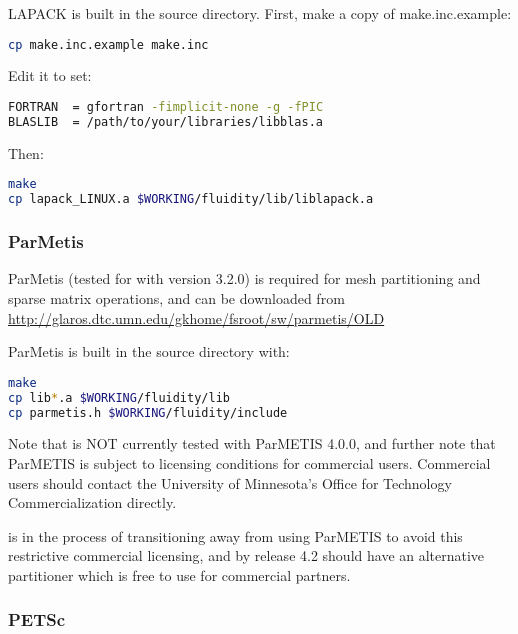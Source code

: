 LAPACK is built in the source directory. First, make a copy of
make.inc.example:

\begin{lstlisting}[language=bash]
cp make.inc.example make.inc
\end{lstlisting}

Edit it to set:

\begin{lstlisting}[language=bash]
FORTRAN  = gfortran -fimplicit-none -g -fPIC
BLASLIB  = /path/to/your/libraries/libblas.a
\end{lstlisting}

Then:

\begin{lstlisting}[language=bash]
make
cp lapack_LINUX.a $WORKING/fluidity/lib/liblapack.a
\end{lstlisting}

\subsubsection{ParMetis}
\label{sec:required_libraries_numerical_parmetis}

ParMetis (tested for \fluidity with version 3.2.0) is required for mesh
partitioning and sparse matrix operations, and can be downloaded from
\url{http://glaros.dtc.umn.edu/gkhome/fsroot/sw/parmetis/OLD}

ParMetis is built in the source directory with:

\begin{lstlisting}[language=bash]
make
cp lib*.a $WORKING/fluidity/lib
cp parmetis.h $WORKING/fluidity/include
\end{lstlisting}

Note that \fluidity is NOT currently tested with ParMETIS 4.0.0, and further
note that ParMETIS is subject to licensing conditions for commercial users.
Commercial users should contact the University of Minnesota's Office for
Technology Commercialization directly. 

\fluidity is in the process of transitioning away from using ParMETIS to avoid
this restrictive commercial licensing, and by release 4.2 should have an
alternative partitioner which is free to use for commercial partners.

\subsubsection{PETSc}
\label{sec:required_libraries_numerical_petsc}

